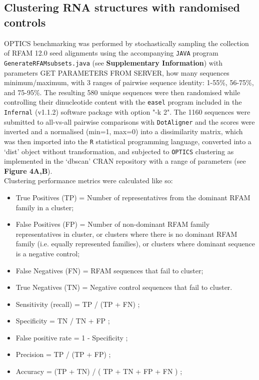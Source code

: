 \documentclass{bmcart}
\newcommand\dotaligner{\texttt{DotAligner}}
\begin{document}
\subsection*{Clustering RNA structures with randomised controls}
OPTICS benchmarking was performed by stochastically sampling the collection of RFAM 12.0 
seed alignments using the accompanying \texttt{JAVA} program \texttt{GenerateRFAMsubsets.java}
(see \textbf{Supplementary Information}) with parameters {\color{red} GET PARAMETERS FROM SERVER, how many sequences minimum/maximum}, 
with 3 ranges of pairwise sequence identity: 1-55\%, 56-75\%, and 75-95\%.  The resulting
580 unique sequences were then randomised while controlling their dinucleotide content with 
the \texttt{easel} program included in the \texttt{Infernal} (v1.1.2) software package 
\cite{nawrocki2013infernal} with option "-k 2". The 1160 sequences were submitted to 
all-vs-all pairwise comparisons with \dotaligner{} and the scores were inverted and a 
normalised (min=1, max=0) into a dissimilarity matrix, which was then imported into
 the \texttt{R} statistical programming language, converted into a `dist' object without
 transformation, and subjected to \texttt{OPTICS} clustering as implemented
in the `dbscan' CRAN repository with a range of parameters (see \textbf{Figure 4A,B}).\\

\noindent Clustering performance metrics were calculated like so: 
\begin{itemize}
\item True Positives (TP) = Number of representatives from the dominant RFAM family in a cluster;
\item False Positives (FP) = Number of non-dominant RFAM family representatives in cluster, or clusters
where there is no dominant RFAM family (i.e. equally represented families), or clusters where dominant sequence is a negative control;
\item False Negatives (FN) = RFAM sequences that fail to cluster; 
\item True Negatives (TN) = Negative control sequences that fail to cluster. 
\item Sensitivity (recall) = TP  / (TP + FN) ;
\item Specificity  = TN / TN + FP ;
\item False positive rate =  1 - Specificity ;
\item Precision = TP / (TP + FP) ;
\item Accuracy = (TP + TN) / ( TP + TN + FP + FN )  ; 
\end{itemize}
\end{document}
